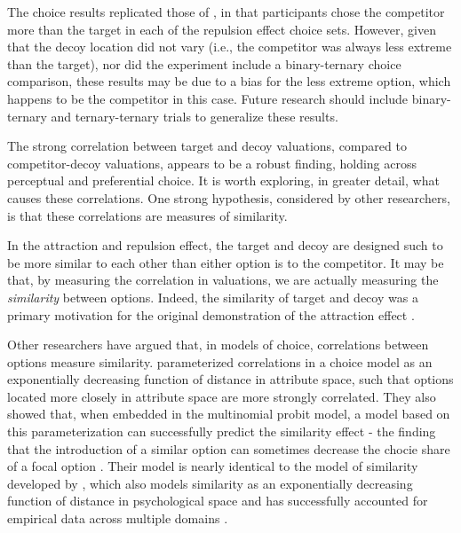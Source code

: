 The choice results replicated those of \textcite{banerjeeFactorsThatPromote2024}, in that participants chose the competitor more than the target in each of the repulsion effect choice sets. However, given that the decoy location did not vary (i.e., the competitor was always less extreme than the target), nor did the experiment include a binary-ternary choice comparison, these results may be due to a bias for the less extreme option, which happens to be the competitor in this case. Future research should include binary-ternary and ternary-ternary trials to generalize these results.

The strong correlation between target and decoy valuations, compared to competitor-decoy valuations, appears to be a robust finding, holding across perceptual and preferential choice. It is worth exploring, in greater detail, what causes these correlations. One strong hypothesis, considered by other researchers, is that these correlations are measures of similarity. 

In the attraction and repulsion effect, the target and decoy are designed such to be more similar to each other than either option is to the competitor. It may be that, by measuring the correlation in valuations, we are actually measuring the \textit{similarity} between options. Indeed, the similarity of target and decoy was a primary motivation for the original demonstration of the attraction effect \parencite{huberAddingAsymmetricallyDominated1982d}. 

Other researchers have argued that, in models of choice, correlations between options measure similarity. \textcite{kamakura1984predicting} parameterized correlations in a choice model as an exponentially decreasing function of distance in attribute space, such that options located more closely in attribute space are more strongly correlated. They also showed that, when embedded in the multinomial probit model, a model based on this parameterization can successfully predict the similarity effect - the finding that the introduction of a similar option can sometimes decrease the chocie share of a focal option \textcite{tverskyEliminationAspectsTheory1972}. Their model is nearly identical to the model of similarity developed by \textcite{shepardUniversalLawGeneralization1987c}, which also models similarity as an exponentially decreasing function of distance in psychological space and has successfully accounted for empirical data across multiple domains \parencite{nosofskyAttentionSimilarityIdentificationCategorization1986,roads2024modeling}. 

